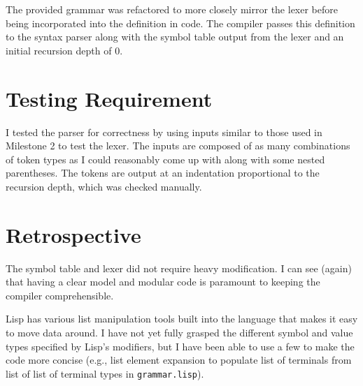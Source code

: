 \documentclass[12pt,letterpaper]{article}
\begin{document}
The provided grammar was refactored to more closely mirror the lexer before
being incorporated into the definition in code. The compiler passes this
definition to the syntax parser along with the symbol table output from the
lexer and an initial recursion depth of 0.

\section*{Testing Requirement}

I tested the parser for correctness by using inputs similar to those used in
Milestone 2 to test the lexer. The inputs are composed of as many combinations
of token types as I could reasonably come up with along with some nested
parentheses. The tokens are output at an indentation proportional to the
recursion depth, which was checked manually.

\section*{Retrospective}

The symbol table and lexer did not require heavy modification. I can see
(again) that having a clear model and modular code is paramount to keeping the
compiler comprehensible.

Lisp has various list manipulation tools built into the language that makes it
easy to move data around. I have not yet fully grasped the different symbol and
value types specified by Lisp's modifiers, but I have been able to use a few to
make the code more concise (e.g., list element expansion to populate list of
terminals from list of list of terminal types in {\tt grammar.lisp}).
\end{document}
